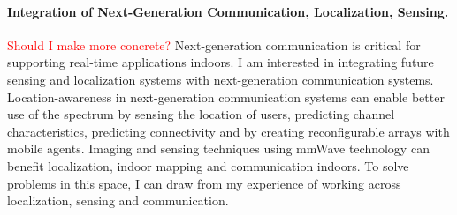 \documentclass[10pt]{article}
\begin{document}


\paragraph{Integration of Next-Generation Communication, Localization, Sensing. }
\textcolor{red}{Should I make more concrete?}
Next-generation communication is critical for supporting real-time applications indoors. I am interested in integrating future sensing and localization systems with next-generation communication systems. %
Location-awareness in next-generation communication systems can enable better use of the
spectrum by sensing the location of users, predicting channel characteristics, predicting connectivity and by creating reconfigurable arrays with mobile agents. Imaging and sensing techniques using mmWave technology can benefit localization, indoor mapping and communication indoors. 
To solve problems in this space, I can draw from my experience of working across localization, sensing and communication. %
\end{document}
